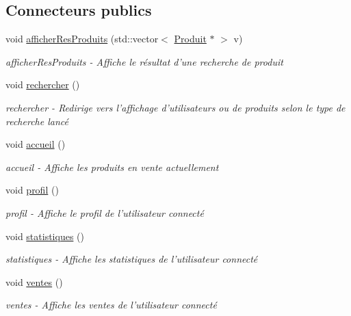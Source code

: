 \subsection*{Connecteurs publics}
\begin{DoxyCompactItemize}
\item 
void \hyperlink{class_ma_fenetre_a115348adbe409a24a0d381e1fcc62fe7}{afficher\-Res\-Produits} (std\-::vector$<$ \hyperlink{class_produit}{Produit} $\ast$ $>$ v)
\begin{DoxyCompactList}\small\item\em afficher\-Res\-Produits -\/ Affiche le résultat d'une recherche de produit \end{DoxyCompactList}\item 
void \hyperlink{class_ma_fenetre_a8107c2666807db431962fdcd4e942c69}{rechercher} ()
\begin{DoxyCompactList}\small\item\em rechercher -\/ Redirige vers l'affichage d'utilisateurs ou de produits selon le type de recherche lancé \end{DoxyCompactList}\item 
void \hyperlink{class_ma_fenetre_abc0a097122f161ced271718b254206cd}{accueil} ()
\begin{DoxyCompactList}\small\item\em accueil -\/ Affiche les produits en vente actuellement \end{DoxyCompactList}\item 
void \hyperlink{class_ma_fenetre_a08a81ac61e783cf5ed3855ca4f18c84e}{profil} ()
\begin{DoxyCompactList}\small\item\em profil -\/ Affiche le profil de l'utilisateur connecté \end{DoxyCompactList}\item 
void \hyperlink{class_ma_fenetre_abdebcc3a608ba960f92d9c33198afa8e}{statistiques} ()
\begin{DoxyCompactList}\small\item\em statistiques -\/ Affiche les statistiques de l'utilisateur connecté \end{DoxyCompactList}\item 
void \hyperlink{class_ma_fenetre_ae0699859505bac920f9cb033ddb1da23}{ventes} ()
\begin{DoxyCompactList}\small\item\em ventes -\/ Affiche les ventes de l'utilisateur connecté \end{DoxyCompactList}\item 

\end{DoxyCompactItemize}
